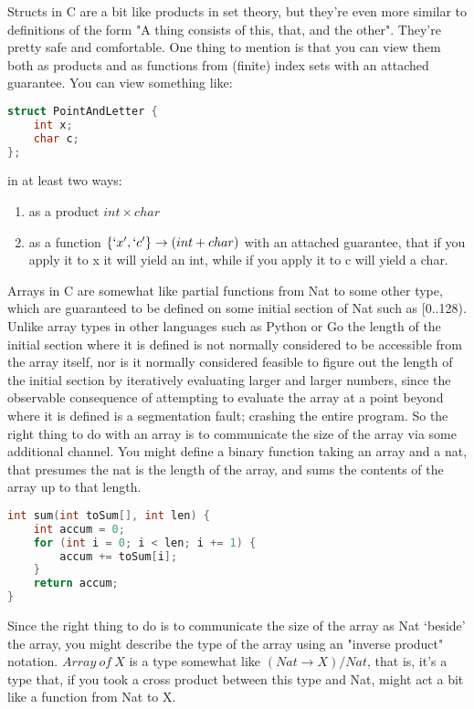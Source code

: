 \documentclass{proc-l}
\theoremstyle{definition}
\theoremstyle{remark}
\numberwithin{equation}{section}
\begin{document}
Structs in C are a bit like products in set theory, but they're even more
similar to definitions of the form "A thing consists of this, that, and the other".
They're pretty safe and comfortable. One thing to mention is that you can view them
both as products and as functions from (finite) index sets with an attached guarantee.
You can view something like:

\begin{lstlisting}[language=C]
struct PointAndLetter {
    int x;
    char c;
};
\end{lstlisting}

in at least two ways:
\begin{enumerate}
\item as a product \(int \times char\)
\item as a function \(\{`x', `c'\} \to (int + char)\) with an attached guarantee, that if you apply it to x it will yield an int, while if you apply it to c will yield a char.
\end{enumerate}

Arrays in C are somewhat like  partial functions from Nat to some other type,
which are guaranteed to be defined on some initial section of Nat such as [0..128).
Unlike array types in other languages such as Python or Go the length of the initial section where it is defined
is not normally considered to be accessible from the array itself,
nor is it normally considered feasible to figure out the length of the initial section by
iteratively evaluating larger and larger numbers, since the observable consequence of
attempting to evaluate the array at a point beyond where it is defined is a segmentation fault;
crashing the entire program. So the right thing to do with an array is to communicate the size of the array
via some additional channel. You might define a binary function taking an array and a nat,
that presumes the nat is the length of the array, and sums the contents of the array up to that length.

\begin{lstlisting}[language=C]
int sum(int toSum[], int len) {
    int accum = 0;
    for (int i = 0; i < len; i += 1) {
        accum += toSum[i];
    }
    return accum;
}
\end{lstlisting}

Since the right thing to do is to communicate the size of the array as Nat `beside' the array,
you might describe the type of the array using an "inverse product" notation.
\(Array~of~X\) is a type somewhat like \((Nat \to X) / Nat\),
that is, it's a type that, if you took a cross product between this type and Nat,
might act a bit like a function from Nat to X.
\end{document}
